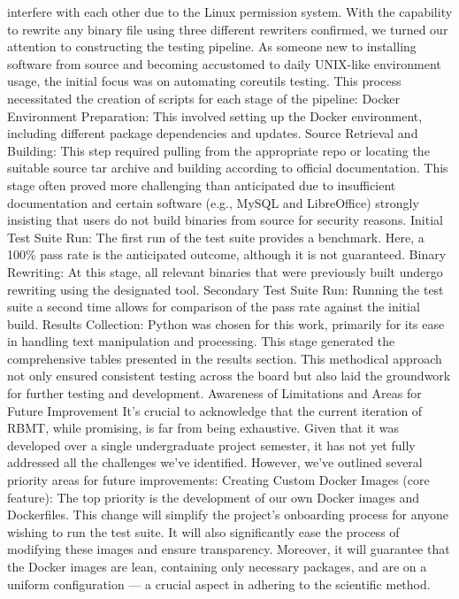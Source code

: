\documentclass[a4paper,11pt,oneside]{report}
\begin{document}
interfere with each other due to the Linux permission system.
With the capability to rewrite any binary file using three different rewriters
confirmed, we turned our attention to constructing the testing pipeline. As someone new to
installing software from source and becoming accustomed to daily UNIX-like environment
usage, the initial focus was on automating coreutils testing.
This process necessitated the creation of scripts for each stage of the pipeline:
Docker Environment Preparation: This involved setting up the Docker environment,
including different package dependencies and updates.
Source Retrieval and Building: This step required pulling from the appropriate repo
or locating the suitable source tar archive and building according to official documentation.
This stage often proved more challenging than anticipated due to insufficient
documentation and certain software (e.g., MySQL and LibreOffice) strongly insisting that
users do not build binaries from source for security reasons.
Initial Test Suite Run: The first run of the test suite provides a benchmark. Here, a
100\% pass rate is the anticipated outcome, although it is not guaranteed.
Binary Rewriting: At this stage, all relevant binaries that were previously built
undergo rewriting using the designated tool.
Secondary Test Suite Run: Running the test suite a second time allows for
comparison of the pass rate against the initial build.
Results Collection: Python was chosen for this work, primarily for its ease in handling
text manipulation and processing. This stage generated the comprehensive tables presented
in the results section.
This methodical approach not only ensured consistent testing across the board but
also laid the groundwork for further testing and development.
Awareness of Limitations and Areas for Future Improvement
It's crucial to acknowledge that the current iteration of RBMT, while promising, is far
from being exhaustive. Given that it was developed over a single undergraduate project
semester, it has not yet fully addressed all the challenges we've identified. However, we've
outlined several priority areas for future improvements:
Creating Custom Docker Images (core feature): The top priority is the development
of our own Docker images and Dockerfiles. This change will simplify the project's
onboarding process for anyone wishing to run the test suite. It will also significantly ease the
process of modifying these images and ensure transparency. Moreover, it will guarantee
that the Docker images are lean, containing only necessary packages, and are on a uniform
configuration — a crucial aspect in adhering to the scientific method.
\end{document}
